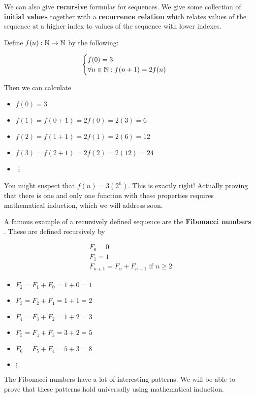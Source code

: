 We can also give  \textbf{recursive} formulas for sequences.   We give some collection of  \textbf{initial values} together with a  \textbf{recurrence relation} which relates values of the sequence at a higher index to values of the sequence with lower indexes.

\begin{example}
		Define $f(n): \mathbb{N} \to \mathbb{N}$ by the following:
		
		\[
		\begin{cases}
				f(0) = 3\\
				\forall n \in \mathbb{N}: f(n+1) = 2f(n) 
			\end{cases}
		\]
		
		Then we can calculate
		
		\begin{itemize}
		\item $f(0) = 3$
		\item $f(1) = f(0+1) = 2f(0) = 2(3) = 6$
		\item $f(2) = f(1+1) = 2f(1) = 2(6) = 12$
		\item $f(3) = f(2+1) = 2f(2) = 2(12) = 24$
		\item \vdots
		\end{itemize}
	
	You might suspect that $f(n) = 3(2^n)$.  This is exactly right!  Actually proving that there is one and only one function with these properties requires mathematical induction, which we will address soon.
	\end{example}

\begin{example}
		A famous example of a recursively defined sequence are the \textbf{Fibonacci numbers} .  These are defined recursively by 
		
		\begin{align*}
			&F_0 = 0\\
			&F_1 = 1\\
			&F_{n+1} = F_{n}+F_{n-1} \textrm{ if $n \geq 2$}
		\end{align*}
	
	\begin{itemize}
			\item $F_2 = F_1 + F_0 = 1+0 = 1$
			\item $F_3 = F_2 + F_1 = 1 + 1 = 2$
			\item $F_4 = F_3 + F_2 = 1+2 = 3$
			\item $F_5 = F_4 + F_3 = 3+2 = 5$
			\item $F_6  =F_5 + F_4 = 5+3 = 8$
			\item $\vdots$
		\end{itemize}
	
	The Fibonacci numbers have a lot of interesting patterns.  We will be able to prove that these patterns hold universally using mathematical induction.
	\end{example}

